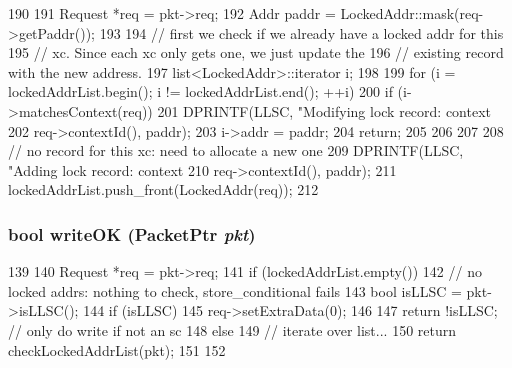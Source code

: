 \begin{DoxyCode}
190 {
191     Request *req = pkt->req;
192     Addr paddr = LockedAddr::mask(req->getPaddr());
193 
194     // first we check if we already have a locked addr for this
195     // xc.  Since each xc only gets one, we just update the
196     // existing record with the new address.
197     list<LockedAddr>::iterator i;
198 
199     for (i = lockedAddrList.begin(); i != lockedAddrList.end(); ++i) {
200         if (i->matchesContext(req)) {
201             DPRINTF(LLSC, "Modifying lock record: context %
202                     req->contextId(), paddr);
203             i->addr = paddr;
204             return;
205         }
206     }
207 
208     // no record for this xc: need to allocate a new one
209     DPRINTF(LLSC, "Adding lock record: context %
210             req->contextId(), paddr);
211     lockedAddrList.push_front(LockedAddr(req));
212 }
\end{DoxyCode}
\hypertarget{classAbstractMemory_ab1136219a28374092ad398d673bd23e0}{
\subsubsection[{writeOK}]{\setlength{\rightskip}{0pt plus 5cm}bool writeOK ({\bf PacketPtr} {\em pkt})}}
\label{classAbstractMemory_ab1136219a28374092ad398d673bd23e0}



\begin{DoxyCode}
139                                 {
140         Request *req = pkt->req;
141         if (lockedAddrList.empty()) {
142             // no locked addrs: nothing to check, store_conditional fails
143             bool isLLSC = pkt->isLLSC();
144             if (isLLSC) {
145                 req->setExtraData(0);
146             }
147             return !isLLSC; // only do write if not an sc
148         } else {
149             // iterate over list...
150             return checkLockedAddrList(pkt);
151         }
152     }
\end{DoxyCode}


